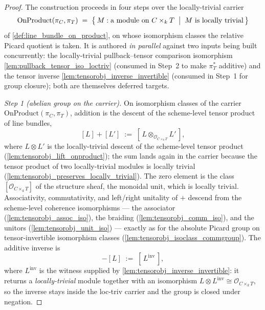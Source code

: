 \begin{proof}


\leanok
  The construction proceeds in four steps over the locally-trivial carrier
  \[
    \mathrm{OnProduct}(\pi_C, \pi_T) \;=\;
      \bigl\{\, M : \text{a module on } C \times_k T \;\bigm|\;
      M \text{ is locally trivial} \,\bigr\}
  \]
  of \cref{def:line_bundle_on_product}, on whose isomorphism classes the
  relative Picard quotient is taken. It is authored \emph{in parallel} against
  two inputs being built concurrently: the locally-trivial pullback--tensor
  comparison isomorphism \cref{lem:pullback_tensor_iso_loctriv} (consumed in
  Step~2 to make \(\pi_T^*\) additive) and the tensor inverse
  \cref{lem:tensorobj_inverse_invertible} (consumed in Step~1 for group
  closure); both are themselves deferred targets.

  \emph{Step 1 (abelian group on the carrier).} On isomorphism classes of the
  carrier \(\mathrm{OnProduct}(\pi_C, \pi_T)\), addition is the descent of the
  scheme-level tensor product of line bundles,
  \[
    [L] + [L'] \;:=\; [\, L \otimes_{\mathcal{O}_{C \times_k T}} L' \,],
  \]
  where \(L \otimes L'\) is the locally-trivial descent of the scheme-level
  tensor product (\cref{lem:tensorobj_lift_onproduct}); the sum lands again in
  the carrier because the tensor product of two locally-trivial modules is
  locally trivial (\cref{lem:tensorobj_preserves_locally_trivial}). The zero
  element is the class \([\mathcal{O}_{C \times_k T}]\) of the structure sheaf,
  the monoidal unit, which is locally trivial. Associativity, commutativity,
  and left/right unitality of \(+\) descend from the scheme-level coherence
  isomorphisms --- the associator (\cref{lem:tensorobj_assoc_iso}), the
  braiding (\cref{lem:tensorobj_comm_iso}), and the unitors
  (\cref{lem:tensorobj_unit_iso}) --- exactly as for the absolute Picard group
  on tensor-invertible isomorphism classes
  (\cref{lem:tensorobj_isoclass_commgroup}). The additive inverse is
  \[
    -[L] \;:=\; [\, L^{\mathrm{inv}} \,],
  \]
  where \(L^{\mathrm{inv}}\) is the witness supplied by
  \cref{lem:tensorobj_inverse_invertible}: it returns a \emph{locally-trivial}
  module together with an isomorphism
  \(L \otimes L^{\mathrm{inv}} \cong \mathcal{O}_{C \times_k T}\), so the inverse
  stays inside the loc-triv carrier and the group is closed under negation.


\end{proof}
